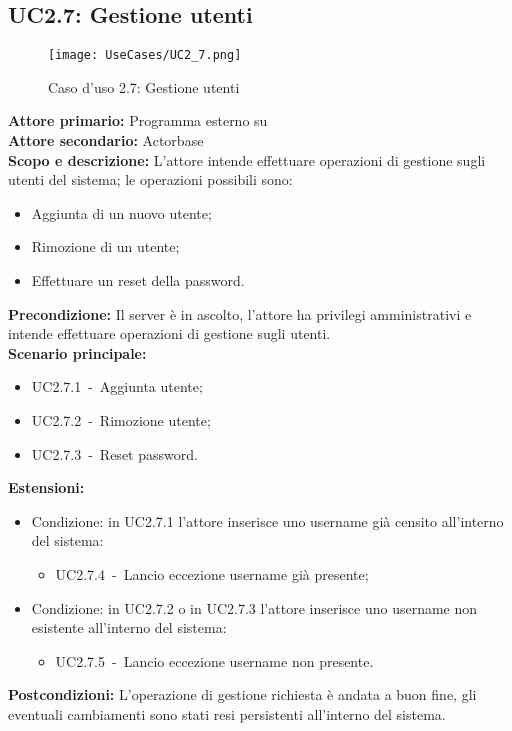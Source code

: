 \documentclass{scalatekids-article}
\begin{document}
\subsection{UC2.7: Gestione utenti}

\begin{figure}[H]
  \begin{center}
    \texttt{[image: UseCases/UC2\_7.png]}
    \caption*{Caso d'uso 2.7: Gestione utenti}
  \end{center}
\end{figure}
\textbf{Attore primario:} Programma esterno su \\
\textbf{Attore secondario:} Actorbase\\
\textbf{Scopo e descrizione:} L'attore intende effettuare operazioni di gestione sugli utenti del sistema; le operazioni possibili sono:
\begin{itemize}
\item Aggiunta di un nuovo utente;
\item Rimozione di un utente;
\item Effettuare un reset della password.
\end{itemize}
\textbf{Precondizione:} Il server è in ascolto, l'attore ha privilegi amministrativi e intende effettuare operazioni di gestione sugli utenti.\\
\textbf{Scenario principale:}
\begin{itemize}
\item UC2.7.1\ -\ Aggiunta utente;
\item UC2.7.2\ -\ Rimozione utente;
\item UC2.7.3\ -\ Reset password.
\end{itemize}
\textbf{Estensioni:}
\begin{itemize}
\item Condizione: in UC2.7.1 l'attore inserisce uno username già censito all'interno del sistema:
  \begin{itemize}
  \item UC2.7.4\ -\ Lancio eccezione username già presente;
  \end{itemize}
\item Condizione: in UC2.7.2 o in UC2.7.3 l'attore inserisce uno username non esistente all'interno del sistema:
  \begin{itemize}
  \item UC2.7.5\ -\ Lancio eccezione username non presente.
  \end{itemize}
\end{itemize}
\textbf{Postcondizioni:} L'operazione di gestione richiesta è andata a buon fine, gli eventuali cambiamenti sono stati resi persistenti all'interno del sistema.
\end{document}
